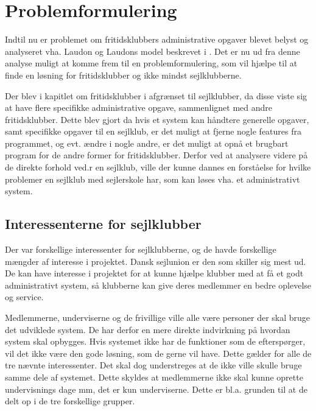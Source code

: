 \chapter{Problemformulering}\label{chap:problemformulering}

Indtil nu er problemet om fritidsklubbers administrative opgaver blevet belyst og analyseret vha. Laudon og Laudons model beskrevet i . Det er nu ud fra denne analyse muligt at komme frem til en problemformulering, som vil hjælpe til at finde en løsning for fritidsklubber og ikke mindst sejlklubberne.

Der blev i kapitlet om fritidsklubber i  afgrænset til sejlklubber, da disse viste sig at have flere specifikke administrative opgave, sammenlignet med andre fritidsklubber. Dette blev gjort da hvis et system kan håndtere generelle opgaver, samt specifikke opgaver til en sejlklub, er det muligt at fjerne nogle features fra programmet, og evt. ændre i nogle andre, er det muligt at opnå et brugbart program for de andre former for fritidsklubber. Derfor ved at analysere videre på de direkte forhold ved.r en sejlklub, ville der kunne dannes en forståelse for hvilke problemer en sejlklub med sejlerskole har, som kan løses vha. et administrativt system. 

\section{Interessenterne for sejlklubber}

Der var forskellige interessenter for sejlklubberne, og de havde forskellige mængder af interesse i projektet. Dansk sejlunion er den som skiller sig mest ud. De kan have interesse i projektet for at kunne hjælpe klubber med at få et godt administrativt system, så klubberne kan give deres medlemmer en bedre oplevelse og service.

Medlemmerne, underviserne og de frivillige ville alle være personer der skal bruge det udviklede system. De har derfor en mere direkte indvirkning på hvordan system skal opbygges. Hvis systemet ikke har de funktioner som de efterspørger, vil det ikke være den gode løsning, som de gerne vil have. Dette gælder for alle de tre nævnte interessenter. Det skal dog understreges at de ikke ville skulle bruge samme dele af systemet. Dette skyldes at medlemmerne ikke skal kunne oprette undervisnings dage mm, det er kun underviserne. Dette er bl.a. grunden til at de delt op i de tre forskellige grupper. 

